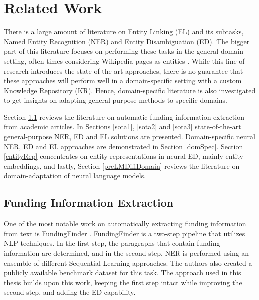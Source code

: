 \documentclass{report}
\theoremstyle{definition}
\theoremstyle{remark}
\begin{document}
\chapter{Related Work}
\label{chap:rw}
There is a large amount of literature on Entity Linking (EL) and its subtasks, Named Entity Recognition (NER) and Entity Disambiguation (ED). The bigger part of this literature focuses on performing these tasks in the general-domain setting, often times considering Wikipedia pages as entities \cite{nlpnotes}. While this line of research introduces the state-of-the-art approaches, there is no guarantee that these approaches will perform well in a domain-specific setting with a custom Knowledge Repository (KR). Hence, domain-specific literature is also investigated to get insights on adapting general-purpose methods to specific domains.

Section \ref{FundingDataExtraction} reviews the literature on automatic funding information extraction from academic articles. In Sections \ref{sota1}, \ref{sota2} and \ref{sota3} state-of-the-art general-purpose NER, ED and EL solutions are presented. Domain-specific neural NER, ED and EL approaches are demonstrated in Section \ref{domSpec}. Section \ref{entityRep} concentrates on entity representations in neural ED, mainly entity embeddings, and lastly, Section \ref{preLMDiffDomain} reviews the literature on domain-adaptation of neural language models.

\section{Funding Information Extraction}
\label{FundingDataExtraction}

    One of the most notable work on automatically extracting funding information from text is FundingFinder \cite{ElsPaper}. FundingFinder is a two-step pipeline that utilizes NLP techniques. In the first step, the paragraphs that contain funding information are determined, and in the second step, NER is performed using an ensemble of different Sequential Learning approaches. The authors also created a publicly available benchmark dataset for this task. The approach used in this thesis builds upon this work, keeping the first step intact while improving the second step, and adding the ED capability. 
    
\end{document}
